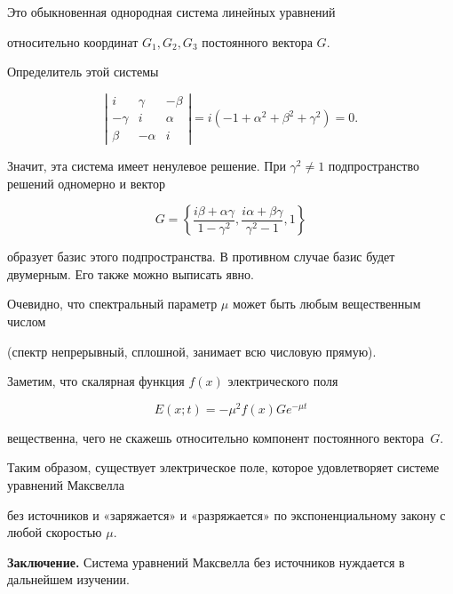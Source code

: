 Это обыкновенная однородная система линейных уравнений 

относительно координат $G_1,G_2,G_3$ постоянного вектора $G$. 

Определитель этой системы

$$

\left| \begin{array}{ccc}

i   &   \gamma   &   -\beta \\

-\gamma & i & \alpha \\

\beta  &  -\alpha  & i 

\end{array} \right| = i(-1 + \alpha^2 + \beta^2 + \gamma^2) = 0. 

$$

Значит, эта система имеет ненулевое решение. При $\gamma^2 \neq 1$ подпространство решений одномерно и вектор

$$ G = \left\{\frac{i\beta+\alpha\gamma}{1-\gamma^2},

\frac{i\alpha+\beta\gamma}{\gamma^2-1}, 1\right\}

$$ 

образует базис этого подпространства. В противном случае базис будет двумерным. Его также можно выписать явно. 



Очевидно, что спектральный параметр $\mu$ может быть любым вещественным числом 

(спектр непрерывный, сплошной, занимает всю числовую прямую). 

Заметим, что скалярная функция $f(x)$ электрического поля 

$$

E(x;t) = -\mu^2f(x)Ge^{-\mu t}

$$

вещественна, чего не скажешь относительно компонент постоянного вектора~$G$.



Таким образом, существует электрическое поле, которое удовлетворяет системе уравнений Максвелла 

без источников и «заряжается» и «разряжается» по экспоненциальному закону с любой скоростью $\mu$. 



\smallskip



{\bf Заключение.} Система уравнений Максвелла без источников нуждается в дальнейшем изучении. 

